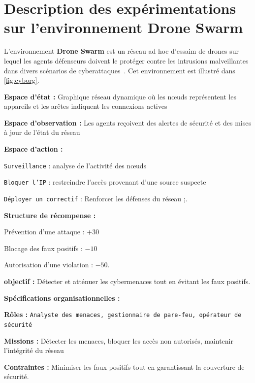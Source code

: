 \section{Description des expérimentations sur l'environnement Drone Swarm}

L'environnement \textbf{Drone Swarm} est un réseau ad hoc d'essaim de drones sur lequel les agents défenseurs doivent le protéger contre les intrusions malveillantes dans divers scénarios de cyberattaques~\cite{Standen2021}. Cet environnement est illustré dans \autoref{fig:cyborg}.

\begin{enumerate*}[label={\roman*)}, itemjoin={; \quad}]
  \item \textbf{Espace d'état :} Graphique réseau dynamique où les nœuds représentent les appareils et les arêtes indiquent les connexions actives
  \item \textbf{Espace d'observation :} Les agents reçoivent des alertes de sécurité et des mises à jour de l'état du réseau
  \item \textbf{Espace d'action :}
  \begin{enumerate*}[label={\roman*)}, itemjoin={; \quad}]
    \item \texttt{Surveillance} : analyse de l'activité des nœuds
    \item \texttt{Bloquer l'IP} : restreindre l'accès provenant d'une source suspecte
    \item \texttt{Déployer un correctif} : Renforcer les défenses du réseau ;.
  \end{enumerate*}
  \item \textbf{Structure de récompense :}
  \begin{enumerate*}[label={\roman*)}, itemjoin={; \quad}]
    \item Prévention d'une attaque : $+30$
    \item Blocage des faux positifs : $-10$
    \item Autorisation d'une violation : $-50$.
  \end{enumerate*}
  \item \textbf{objectif :} Détecter et atténuer les cybermenaces tout en évitant les faux positifs.
\end{enumerate*}
%
\textbf{Spécifications organisationnelles :}
\begin{enumerate*}[label={\roman*)}, itemjoin={; \quad}]
  \item \textbf{Rôles :} \texttt{Analyste des menaces, gestionnaire de pare-feu, opérateur de sécurité}
  \item \textbf{Missions :} Détecter les menaces, bloquer les accès non autorisés, maintenir l'intégrité du réseau
  \item \textbf{Contraintes :} Minimiser les faux positifs tout en garantissant la couverture de sécurité.
\end{enumerate*}

